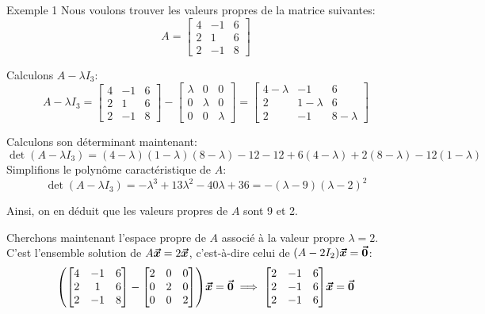 \documentclass[a4paper]{article}
\begin{document}
\begin{parag}{Exemple 1}
    Nous voulons trouver les valeurs propres de la matrice suivantes: 
    \[A = \begin{bmatrix} 4 & -1 & 6 \\ 2 & 1 & 6 \\ 2 & -1 & 8 \end{bmatrix} \]
    
    Calculons $A - \lambda I_3$: 
    \[A - \lambda I_3 = \begin{bmatrix} 4 & -1 & 6 \\ 2 & 1 & 6 \\ 2 & -1 & 8 \end{bmatrix} - \begin{bmatrix} \lambda & 0 & 0 \\ 0 & \lambda & 0 \\ 0 & 0 & \lambda \end{bmatrix} = \begin{bmatrix} 4 - \lambda & -1 & 6 \\ 2 & 1 - \lambda & 6 \\ 2 & -1 & 8 - \lambda \end{bmatrix} \]

    Calculons son déterminant maintenant: 
    \[\det\left(A - \lambda I_3\right) = \left(4 - \lambda\right)\left(1 - \lambda\right)\left(8- \lambda\right) -12 - 12 + 6\left(4 - \lambda\right) + 2\left(8 -\lambda\right) - 12\left(1 - \lambda\right)\]
    Simplifions le polynôme caractéristique de $A$:
    \[\det\left(A - \lambda I_3\right) = -\lambda^3 + 13\lambda^2 - 40\lambda + 36 = -\left(\lambda - 9\right)\left(\lambda - 2\right)^2\]

    Ainsi, on en déduit que les valeurs propres de $A$ sont 9 et 2.

    Cherchons maintenant l'espace propre de $A$ associé à la valeur propre $\lambda = 2$. C'est l'ensemble solution de $A \bm{\protect\vec{x}} = 2 \bm{\protect\vec{x}}$, c'est-à-dire celui de $\left(A - 2I_2\right)\bvec{x} = \bvec{0}$: 
    \[\left(\begin{bmatrix} 4 & -1 & 6 \\ 2 & 1 & 6 \\ 2 & -1 & 8 \end{bmatrix} - \begin{bmatrix} 2 & 0 & 0 \\ 0 & 2 & 0 \\ 0 & 0 & 2 \end{bmatrix} \right) \bvec{x} = \bvec{0} \implies \begin{bmatrix} 2 & -1 & 6 \\ 2 & -1 & 6 \\ 2 & -1 & 6 \end{bmatrix} \bvec{x} = \bvec{0}\]
    

\end{parag}
\end{document}
